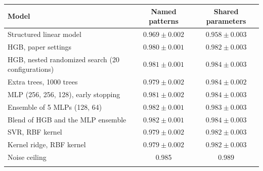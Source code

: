 \begin{tabular}{lcc}
\toprule
Model & Named patterns & Shared parameters \\
\midrule
Structured linear model & $0.969 \pm 0.002$ & $0.958 \pm 0.003$ \\
\midrule
HGB, paper settings & $0.980 \pm 0.001$ & $0.982 \pm 0.003$ \\
HGB, nested randomized search (20 configurations) & $0.981 \pm 0.001$ & $0.984 \pm 0.003$ \\
Extra trees, 1000 trees & $0.979 \pm 0.002$ & $0.984 \pm 0.002$ \\
MLP (256, 256, 128), early stopping & $0.981 \pm 0.002$ & $0.984 \pm 0.003$ \\
Ensemble of 5 MLPs (128, 64) & $0.982 \pm 0.001$ & $0.983 \pm 0.003$ \\
Blend of HGB and the MLP ensemble & $0.982 \pm 0.001$ & $0.984 \pm 0.003$ \\
SVR, RBF kernel & $0.979 \pm 0.002$ & $0.982 \pm 0.003$ \\
Kernel ridge, RBF kernel & $0.979 \pm 0.002$ & $0.982 \pm 0.003$ \\
\midrule
Noise ceiling & 0.985 & 0.989 \\
\botrule
\end{tabular}

